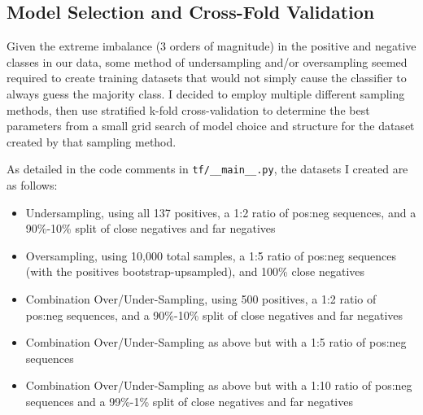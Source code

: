 \documentclass[12pt]{article}
\begin{document}
\subsection*{Model Selection and Cross-Fold Validation}
Given the extreme imbalance (3 orders of magnitude) in the positive and negative classes in our data, some method of undersampling and/or oversampling seemed required to create training datasets that would not simply cause the classifier to always guess the majority class. I decided to employ multiple different sampling methods, then use stratified k-fold cross-validation to determine the best parameters from a small grid search of model choice and structure for the dataset created by that sampling method. 
\par As detailed in the code comments in \verb|tf/__main__.py|, the datasets I created are as follows:
\begin{itemize}
	\item Undersampling, using all 137 positives, a 1:2 ratio of pos:neg sequences, and a 90\%-10\% split of close negatives and far negatives 
	\item Oversampling, using 10,000 total samples, a 1:5 ratio of pos:neg sequences (with the positives bootstrap-upsampled), and 100\% close negatives
	\item Combination Over/Under-Sampling, using 500 positives, a 1:2 ratio of pos:neg sequences, and a 90\%-10\% split of close negatives and far negatives 
	\item Combination Over/Under-Sampling as above but with a 1:5 ratio of pos:neg sequences
	\item Combination Over/Under-Sampling as above but with a 1:10 ratio of pos:neg sequences and a 99\%-1\% split of close negatives and far negatives  
\end{itemize}
\end{document}
